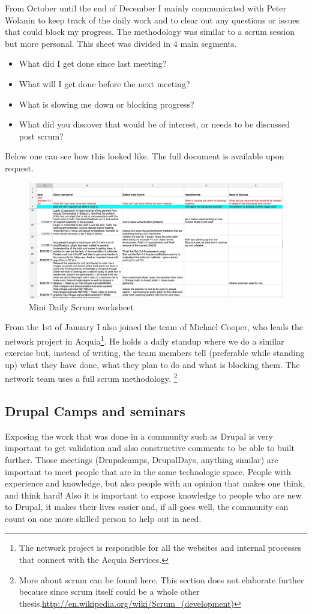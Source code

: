 From October until the end of December I mainly communicated with Peter Wolanin to keep track of the daily work and to clear out any questions or issues that could block my progress. The methodology was similar to a scrum session but more personal. This sheet was divided in 4 main segments.
\begin{itemize}
  \item What did I get done since last meeting?
  \item What will I get done before the next meeting?
  \item What is slowing me down or blocking progress?
  \item What did you discover that would be of interest, or needs to be discussed post scrum?
\end{itemize}

Below one can see how this looked like. The full document is available upon request. 
\begin{figure}[H]
     \includegraphics[width=\textwidth]{images/scrum_example_solr.jpg}
     \caption{Mini Daily Scrum worksheet}
\end{figure}

From the 1st of January I also joined the team of Michael Cooper, who leads the network project in Acquia\footnote{The network project is responsible for all the websites and internal processes that connect with the Acquia Services.}. He holds a daily standup where we do a similar exercise but, instead of writing, the team members tell (preferable while standing up) what they have done, what they plan to do and what is blocking them. The network team uses a full scrum methodology. \footnote{More about scrum can be found here. This section does not elaborate further because since scrum itself could be a whole other thesis.\url{http://en.wikipedia.org/wiki/Scrum_(development)}}

\subsection{Drupal Camps and seminars}
Exposing the work that was done in a community such as Drupal is very important to get validation and also constructive comments to be able to built further. Those meetings (Drupalcamps, DrupalDays, anything similar) are important to meet people that are in the same technologic space. People with experience and knowledge, but also people with an opinion that makes one think, and think hard! Also it is important to expose knowledge to people who are new to Drupal, it makes their lives easier and, if all goes well, the community can count on one more skilled person to help out in need. 

